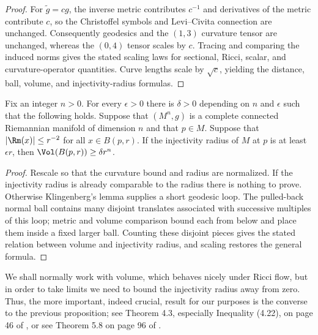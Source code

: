 \begin{proof}
\sketch
{}
For $\tilde g=cg$, the inverse metric contributes $c^{-1}$ and derivatives of the metric contribute $c$, so the Christoffel symbols and Levi--Civita connection are unchanged. Consequently geodesics and the $(1,3)$ curvature tensor are unchanged, whereas the $(0,4)$ tensor scales by $c$. Tracing and comparing the induced norms gives the stated scaling laws for sectional, Ricci, scalar, and curvature-operator quantities. Curve lengths scale by $\sqrt c$, yielding the distance, ball, volume, and injectivity-radius formulas.
\end{proof}


\begin{proposition}
\label{prop:injectivity-radius-volume}
\label{injvol}

Fix an integer $n>0$. For every $\epsilon>0$ there is $\delta>0$
depending on $n$ and $\epsilon$ such that the following holds.
Suppose that $(M^n,g)$ is a complete connected Riemannian
manifold of dimension $n$ and that $p\in M$. Suppose that $|\Rm(x)|\le
r^{-2}$ for all $x\in B(p,r)$. If the injectivity radius of $M$ at
$p$ is at least $\epsilon r$, then $\Vol(B(p,r))\ge \delta
r^n$.
\end{proposition}

\begin{proof}
\sketch
{}
Rescale so that the curvature bound and radius are normalized. If the injectivity radius is already comparable to the radius there is nothing to prove. Otherwise Klingenberg's lemma supplies a short geodesic loop. The pulled-back normal ball contains many disjoint translates associated with successive multiples of this loop; metric and volume comparison bound each from below and place them inside a fixed larger ball. Counting these disjoint pieces gives the stated relation between volume and injectivity radius, and scaling restores the general formula.
\end{proof}

 We shall normally work with volume, which behaves nicely under Ricci
flow, but in order to take limits we need to bound the injectivity
radius away from zero. Thus, the more important, indeed crucial,
result for our purposes is the converse to the previous proposition;
see Theorem 4.3, especially Inequality (4.22), on page 46 of
\cite{CheegerGromovTaylor}, or see Theorem 5.8 on page 96 of
\cite{CheegerEbin}.

